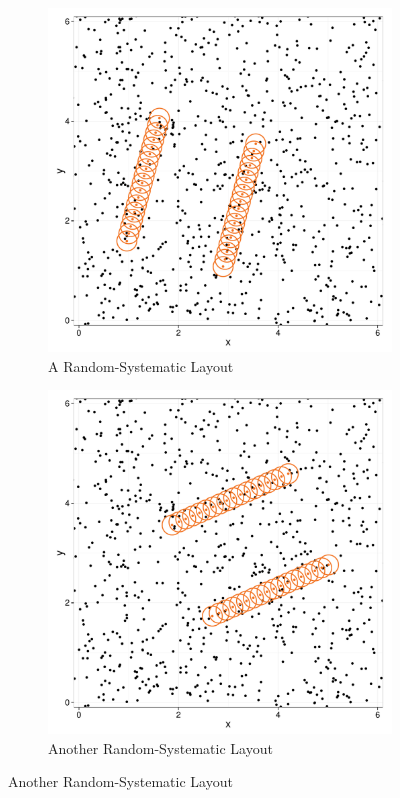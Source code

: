 \documentclass[12pt]{article}
\begin{document}
\begin{figure}
	\begin{subfigure}[b]{0.45\textwidth}
		\includegraphics[width=\textwidth]{../images/layout_rand-sys-4.pdf}
		\caption{A Random-Systematic Layout}
		\label{fig:transect1}
	\end{subfigure}
	\begin{subfigure}[b]{0.45\textwidth}
		\includegraphics[width=\textwidth]{../images/layout_rand-sys-6.pdf}
		\caption{Another Random-Systematic Layout}
		\label{fig:transect2}
	\end{subfigure}
	\label{fig:layouts}
\end{figure}
\end{document}
